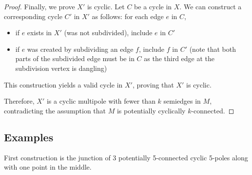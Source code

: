 \documentclass[12pt, twoside]{book}
\begin{document}
\begin{proof}
	Finally, we prove $X'$ is cyclic. Let $C$ be a cycle in $X$. We can construct a corresponding cycle $C'$ in $X'$ as follows: for each edge $e$ in $C$,
	\begin{itemize}
		\item if $e$ exists in $X'$ (was not subdivided), include $e$ in $C'$
		\item if $e$ was created by subdividing an edge $f$, include $f$ in $C'$ (note that both parts of the subdivided edge must be in $C$ as the third edge at the subdivision vertex is dangling)
	\end{itemize}
	This construction yields a valid cycle in $X'$, proving that $X'$ is cyclic.
	
	Therefore, $X'$ is a cyclic multipole with fewer than $k$ semiedges in $M$, contradicting the assumption that $M$ is potentially cyclically $k$-connected.
\end{proof}

\subsection{Examples}

First construction is the junction of 3 potentially 5-connected cyclic 5-poles along with one point in the middle.
\end{document}
